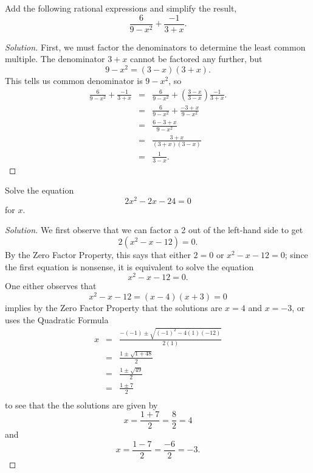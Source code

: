 \documentclass[12pt]{amsart}
\begin{document}
\begin{thm}[16 Points]\label{ex9}
  Add the following rational expressions and simplify the result,
  $$\frac{6}{9 - x^2} + \frac{-1}{3 + x}.$$

  \begin{proof}[Solution]
    First, we must factor the denominators to determine the least common multiple.
    The denominator $3 + x$ cannot be factored any further, but
    $$9 - x^2 = (3 - x)(3 + x).$$
    This tells us common denominator is $9 - x^2$, so
    \begin{eqnarray*}
      \frac{6}{9 - x^2} + \frac{-1}{3 + x} &=& \frac{6}{9 - x^2} + \left(\frac{3 - x}{3 - x}\right)\frac{-1}{3 + x}.\\
      &=& \frac{6}{9 - x^2} + \frac{-3 + x}{9 - x^2}\\
      &=& \frac{6 - 3 + x}{9 - x^2}\\
      &=& \frac{3 + x}{(3 + x)(3 - x)}\\
      &=& \frac{1}{3 - x}.
    \end{eqnarray*}
  \end{proof}
\end{thm}

\begin{thm}[16 Points]\label{ex10}
  Solve the equation
  $$2x^2 - 2x - 24 = 0$$
  for $x$.
  \begin{proof}[Solution]
    We first observe that we can factor a 2 out of the left-hand side to get
    $$2(x^2 - x - 12) = 0.$$
    By the Zero Factor Property, this says that either $2 = 0$ or $x^2 - x - 12 = 0$; since the first equation is nonsense, it is equivalent to solve the equation
    $$x^2 - x - 12 = 0.$$
    One either observes that
    $$x^2 - x - 12 = (x - 4)(x + 3) = 0$$
    implies by the Zero Factor Property that the solutions are $x = 4$ and $x = -3$, or uses the Quadratic Formula
    \begin{eqnarray*}
      x &=& \frac{-(-1) \pm \sqrt{(-1)^2 - 4(1)(-12)}}{2(1)}\\
      &=& \frac{1 \pm \sqrt{1 + 48}}{2}\\
      &=& \frac{1 \pm \sqrt{49}}{2}\\
      &=& \frac{1 \pm 7}{2}\\
    \end{eqnarray*}
    to see that the the solutions are given by
    $$x = \frac{1 + 7}{2} = \frac{8}{2} = 4$$
    and
    $$x = \frac{1 - 7}{2} = \frac{-6}{2} = -3.$$
  \end{proof}
\end{thm}
\end{document}
